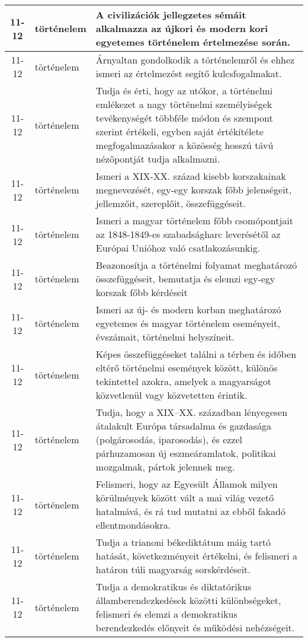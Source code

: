\begin{small}
\begin{longtable}{c | p{2cm} |  p{11cm} }
              11-12 & történelem & A civilizációk jellegzetes sémáit alkalmazza az újkori és modern kori egyetemes történelem értelmezése során. \\ \hline
              11-12 & történelem & Árnyaltan gondolkodik a történelemről és ehhez ismeri az értelmezést segítő kulcsfogalmakat. \\ \hline
              11-12 & történelem & Tudja és érti, hogy az utókor, a történelmi emlékezet a nagy történelmi személyiségek tevékenységét többféle módon és szempont szerint értékeli, egyben saját értékítélete megfogalmazásakor a közösség hosszú távú nézőpontját tudja alkalmazni. \\ \hline
              11-12 & történelem & Ismeri a XIX-XX. század kisebb korszakainak megnevezését, egy-egy korszak főbb jelenségeit, jellemzőit, szereplőit, összefüggéseit. \\ \hline
              11-12 & történelem & Ismeri a magyar történelem főbb csomópontjait az 1848-1849-es szabadságharc leverésétől az Európai Unióhoz való csatlakozásunkig. \\ \hline
              11-12 & történelem & Beazonosítja a történelmi folyamat meghatározó összefüggéseit, bemutatja és elemzi egy-egy korszak főbb kérdéseit \\ \hline
              11-12 & történelem & Ismeri az új- és modern korban meghatározó egyetemes és magyar történelem eseményeit, évszámait, történelmi helyszíneit. \\ \hline
              11-12 & történelem & Képes összefüggéseket találni a térben és időben eltérő történelmi események között, különös tekintettel azokra, amelyek a magyarságot közvetlenül vagy közvetetten érintik. \\ \hline
              11-12 & történelem & Tudja, hogy a XIX–XX. században lényegesen átalakult Európa társadalma és gazdasága (polgárosodás, iparosodás), és ezzel párhuzamosan új eszmeáramlatok, politikai mozgalmak, pártok jelennek meg. \\ \hline
              11-12 & történelem & Felismeri, hogy az Egyesült Államok milyen körülmények között vált a mai világ vezető hatalmává, és rá tud mutatni az ebből fakadó ellentmondásokra. \\ \hline
              11-12 & történelem & Tudja a trianoni békediktátum máig tartó hatását, következményeit értékelni, és felismeri a határon túli magyarság sorskérdéseit. \\ \hline
              11-12 & történelem & Tudja a demokratikus és diktatórikus államberendezkedések közötti különbségeket, felismeri és elemzi a demokratikus berendezkedés előnyeit és működési nehézségeit. \\ \hline

\end{longtable}
\end{small}
